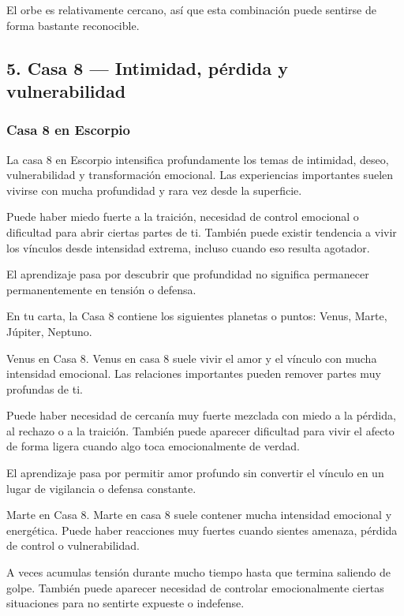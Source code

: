 \documentclass[11pt,a4paper]{article}
\begin{document}
El orbe es relativamente cercano, así que esta combinación puede sentirse de forma bastante reconocible.

\vspace{0.4cm}

\subsection{5. Casa 8 — Intimidad, pérdida y vulnerabilidad}

\subsubsection*{Casa 8 en Escorpio}

La casa 8 en Escorpio intensifica profundamente los temas de intimidad, deseo, vulnerabilidad y transformación emocional. Las experiencias importantes suelen vivirse con mucha profundidad y rara vez desde la superficie.

Puede haber miedo fuerte a la traición, necesidad de control emocional o dificultad para abrir ciertas partes de ti. También puede existir tendencia a vivir los vínculos desde intensidad extrema, incluso cuando eso resulta agotador.

El aprendizaje pasa por descubrir que profundidad no significa permanecer permanentemente en tensión o defensa.

En tu carta, la Casa 8 contiene los siguientes planetas o puntos: Venus, Marte, Júpiter, Neptuno.

Venus en Casa 8.
Venus en casa 8 suele vivir el amor y el vínculo con mucha intensidad emocional. Las relaciones importantes pueden remover partes muy profundas de ti.

Puede haber necesidad de cercanía muy fuerte mezclada con miedo a la pérdida, al rechazo o a la traición. También puede aparecer dificultad para vivir el afecto de forma ligera cuando algo toca emocionalmente de verdad.

El aprendizaje pasa por permitir amor profundo sin convertir el vínculo en un lugar de vigilancia o defensa constante.

Marte en Casa 8.
Marte en casa 8 suele contener mucha intensidad emocional y energética. Puede haber reacciones muy fuertes cuando sientes amenaza, pérdida de control o vulnerabilidad.

A veces acumulas tensión durante mucho tiempo hasta que termina saliendo de golpe. También puede aparecer necesidad de controlar emocionalmente ciertas situaciones para no sentirte expueste o indefense.
\end{document}

